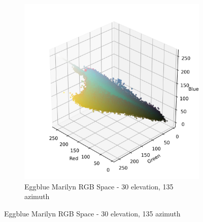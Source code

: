 \documentclass{article}
\begin{document}
\begin{figure}[ht]
\begin{subfigure}{0.45\textwidth}
    \includegraphics[width=\textwidth]{main_files/figure-latex/4_18_eggblue_marilyn_original_scatter.jpg}
    \caption{Eggblue Marilyn RGB Space - 30 \degree elevation, 135 \degree azimuth}
    \label{fig:4_18_eggblue_marilyn_original_scatter}
  \end{subfigure}
  \label{fig:eggblue_marilyn_original_scatter_1}
\end{figure}
\end{document}

